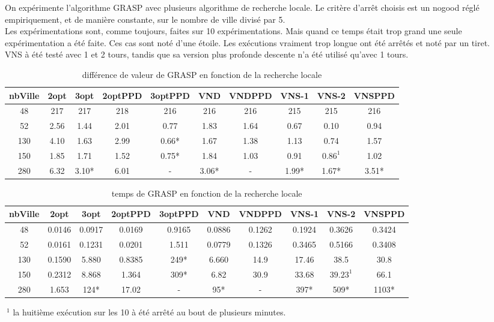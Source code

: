 \documentclass[12pt,a4paper]{article}
\begin{document}
On expérimente l'algorithme GRASP avec plusieurs algorithme de recherche locale. Le critère d’arrêt choisis est un nogood réglé empiriquement, et de manière constante, sur le nombre de ville divisé par 5.\\
Les expérimentations sont, comme toujours, faites sur 10 expérimentations. Mais quand ce temps était trop grand une seule expérimentation a été faite. Ces cas sont noté d'une étoile. Les exécutions vraiment trop longue ont été arrêtés et noté par un tiret.\\
VNS à été testé avec 1 et 2 tours, tandis que sa version plus profonde descente n'a été utilisé qu'avec 1 tours.\\

\begin{table}[!h]
\centering
\begin{tabular}{|*{10}{c|}}
  \hline
  nbVille & 2opt & 3opt & 2optPPD & 3optPPD & VND & VNDPPD & VNS-1 & VNS-2 & VNSPPD \\
  \hline
  48 & 217 & 217 & 218 & 216 & 216 & 216 & 215 & 215 & 216 \\ 
  52 & 2.56 & 1.44 & 2.01 & 0.77 & 1.83 & 1.64 & 0.67 & 0.10 & 0.94 \\
  130 & 4.10 & 1.63 & 2.99 & 0.66* & 1.67 & 1.38 & 1.13 & 0.74 & 1.57 \\
  150 & 1.85 & 1.71 & 1.52 &  0.75* & 1.84 & 1.03 & 0.91 & $0.86^1$ & 1.02 \\  
  280 & 6.32 & 3.10* & 6.01 & - & 3.06* & - & 1.99* & 1.67* & 3.51* \\
  \hline
\end{tabular}
\caption{différence de valeur de GRASP en fonction de la recherche locale}
\label{recherchelocaleGRASPvaleurs}
\end{table}

\begin{table}[!h]
\centering
\begin{tabular}{|*{10}{c|}}
  \hline
  nbVille & 2opt & 3opt & 2optPPD & 3optPPD & VND & VNDPPD & VNS-1 & VNS-2 & VNSPPD \\
  \hline
  48 & 0.0146 & 0.0917 & 0.0169 & 0.9165 & 0.0886 & 0.1262 & 0.1924 & 0.3626 & 0.3424 \\ 
  52 & 0.0161 & 0.1231 & 0.0201 & 1.511 & 0.0779 & 0.1326 & 0.3465 & 0.5166 & 0.3408 \\
  130 & 0.1590 & 5.880 & 0.8385 & 249* & 6.660 & 14.9 & 17.46 & 38.5 & 30.8 \\
  150 & 0.2312 & 8.868 & 1.364 & 309* & 6.82 & 30.9 & 33.68 & $39.23^1$ & 66.1 \\  
  280 & 1.653 & 124* & 17.02 & - & 95* & - & 397* & 509* & 1103* \\
  \hline
\end{tabular}
\caption{temps de GRASP en fonction de la recherche locale}
\label{recherchelocaleGRASPtemps}
\end{table}
$~^1$ la huitième exécution sur les 10 à été arrêté au bout de plusieurs minutes.\\
\end{document}
